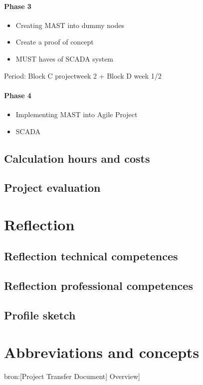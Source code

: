 \documentclass[12pt,a4paper]{report}
\begin{document}
\subsubsection{Phase 3}
\begin{itemize}
\item Creating MAST into dummy nodes
\item Create a proof of concept
\item MUST haves of SCADA system
\end{itemize}
Period: Block C projectweek 2 + Block D week 1/2

\subsubsection{Phase 4}
\begin{itemize}
\item Implementing MAST into Agile Project
\item SCADA
\end{itemize}

\section{Calculation hours and costs}

\newpage
\section{Project evaluation}

\chapter{Reflection}
\section{Reflection technical competences}

\newpage
\section{Reflection professional competences}

\newpage
\section{Profile sketch}

\chapter{Abbreviations and concepts}
bron:[Project Transfer Document] Overview]
\end{document}
